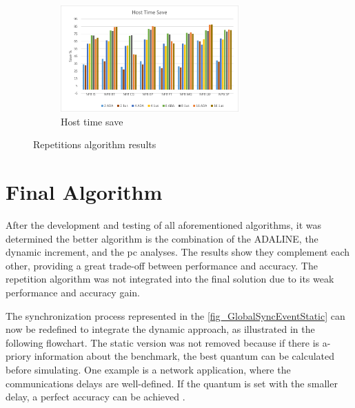 \begin{figure}[H]
\begin{subfigure}{\textwidth}
    \centering
    \includegraphics[width=0.75\textwidth]{Images/Host_ADA.png}
    \caption{ Host time save}
    \label{fig:Host_ADAINCPCREP}
\end{subfigure}
        
\caption{Repetitions algorithm results}
\label{fig:results_ADAINCPCREP}
\end{figure}






\section{Final Algorithm}
\label{subsec::finalAlgorithm}

After the development and testing of all aforementioned algorithms, it was determined the better algorithm is the combination of the ADALINE, 
the dynamic increment, and the \gls{pc} analyses. The results show they complement each other, providing a great trade-off between performance 
and accuracy. The repetition algorithm was not integrated into the final solution due to its weak performance and accuracy gain. 

The synchronization process represented in the \autoref{fig_GlobalSyncEventStatic} can now be redefined to integrate the dynamic approach, 
as illustrated in the following flowchart. The static version was not removed because if there is a-priory information about the benchmark, 
the best quantum can be calculated before simulating. One example is a network application, where the communications delays are well-defined. 
If the quantum is set with the smaller delay, a perfect accuracy can be achieved \cite{dist-gem5}. 

